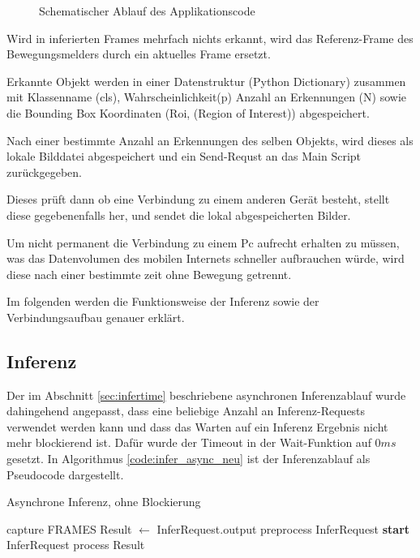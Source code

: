 \vspace{1cm}
\begin{figure}[H]
    \centering
        
    \caption{Schematischer Ablauf des Applikationscode}
    \label{fig:flowchart_appl}
\end{figure}
\vspace{1cm}


Wird in inferierten Frames mehrfach nichts 
erkannt, wird das Referenz-Frame des 
Bewegungsmelders durch ein aktuelles Frame ersetzt.

Erkannte Objekt werden in einer
Datenstruktur (Python Dictionary) zusammen 
mit Klassenname (cls), Wahrscheinlichkeit(p)
Anzahl an Erkennungen (N) sowie die Bounding 
Box Koordinaten (Roi, (Region of Interest)) 
abgespeichert.

Nach einer bestimmte Anzahl 
an Erkennungen des selben Objekts, wird dieses 
als lokale Bilddatei abgespeichert und ein 
Send-Requst an das Main Script zurückgegeben.

Dieses prüft dann ob eine Verbindung zu einem 
anderen Gerät besteht, stellt diese gegebenenfalls her,
und sendet die lokal abgespeicherten Bilder.

Um nicht permanent die Verbindung zu einem Pc aufrecht erhalten 
zu müssen, was das Datenvolumen des mobilen Internets
schneller aufbrauchen würde, wird diese nach einer 
bestimmte zeit ohne Bewegung getrennt.

Im folgenden werden die Funktionsweise der 
Inferenz sowie der Verbindungsaufbau 
genauer erklärt.


\subsection*{Inferenz}

Der im Abschnitt \ref{sec:infertime} beschriebene asynchronen
Inferenzablauf wurde dahingehend angepasst, dass eine beliebige
Anzahl an Inferenz-Requests verwendet werden kann 
und dass das Warten auf ein Inferenz Ergebnis
nicht mehr blockierend ist.
Dafür wurde der Timeout in der Wait-Funktion auf 
$0ms$ gesetzt.
In Algorithmus \ref{code:infer_async_neu} ist 
der Inferenzablauf als Pseudocode dargestellt.

\begin{algorithm}[H]
    \caption{Asynchrone Inferenz, ohne Blockierung}
    \label{code:infer_async_neu}
    \begin{algorithmic}
    \WHILE{\TRUE}
    \STATE capture FRAMES
                \STATE Result $\leftarrow$ InferRequest.output
            \ENDIF
                \STATE preprocess InferRequest
                \STATE \textbf{start} InferRequest
            \ENDIF
                \STATE process Result
            \ENDIF
        \ENDFOR
    \ENDWHILE
    \end{algorithmic}
\end{algorithm}    





